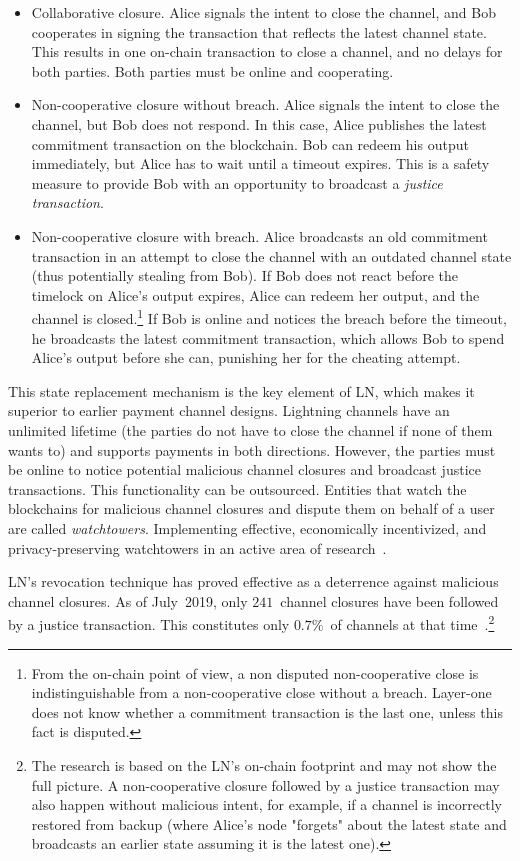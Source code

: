 \begin{itemize}
	\item Collaborative closure. Alice signals the intent to close the channel, and Bob cooperates in signing the transaction that reflects the latest channel state. This results in one on-chain transaction to close a channel, and no delays for both parties. Both parties must be online and cooperating.
	\item Non-cooperative closure without breach. Alice signals the intent to close the channel, but Bob does not respond. In this case, Alice publishes the latest commitment transaction on the blockchain. Bob can redeem his output immediately, but Alice has to wait until a timeout expires. This is a safety measure to provide Bob with an opportunity to broadcast a \textit{justice transaction}.
	\item Non-cooperative closure with breach. Alice broadcasts an old commitment transaction in an attempt to close the channel with an outdated channel state (thus potentially stealing from Bob). If Bob does not react before the timelock on Alice's output expires, Alice can redeem her output, and the channel is closed.\footnote{From the on-chain point of view, a non disputed non-cooperative close is indistinguishable from a non-cooperative close without a breach. Layer-one does not know whether a commitment transaction is the last one, unless this fact is disputed.} If Bob is online and notices the breach before the timeout, he broadcasts the latest commitment transaction, which allows Bob to spend Alice's output before she can, punishing her for the cheating attempt.
\end{itemize}

This state replacement mechanism is the key element of LN, which makes it superior to earlier payment channel designs.
Lightning channels have an unlimited lifetime (the parties do not have to close the channel if none of them wants to) and supports payments in both directions.
However, the parties must be online to notice potential malicious channel closures and broadcast justice transactions.
This functionality can be outsourced.
Entities that watch the blockchains for malicious channel closures and dispute them on behalf of a user are called \textit{watchtowers}.
Implementing effective, economically incentivized, and privacy-preserving watchtowers in an active area of research~\cite{McCorry2019}.

LN's revocation technique has proved effective as a deterrence against malicious channel closures.
As of July~2019, only $241$~channel closures have been followed by a justice transaction.
This constitutes only $0.7\%$~of channels at that time~\cite{BitMEXLN3}.\footnote{The research is based on the LN's on-chain footprint and may not show the full picture. A non-cooperative closure followed by a justice transaction may also happen without malicious intent, for example, if a channel is incorrectly restored from backup (where Alice's node "forgets" about the latest state and broadcasts an earlier state assuming it is the latest one).}


